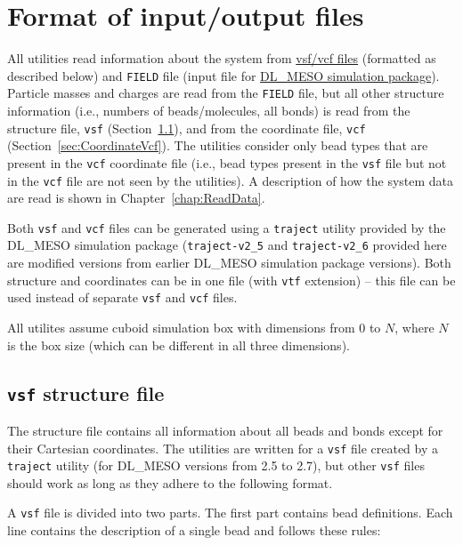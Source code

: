 \chapter{Format of input/output files}\label{chap:input}

All utilities read information about the system from
\href{https://github.com/olenz/vtfplugin/wiki/VTF-format}{vsf/vcf files}
(formatted as described below) and \texttt{FIELD} file (input file for
\href{http://www.scd.stfc.ac.uk//research/app/ccg/software/DL_MESO/40694.aspx}{DL\_MESO
simulation package}).  Particle masses and charges are read from the
\texttt{FIELD} file, but all other structure information (i.e., numbers of
beads/molecules, all bonds) is read from the structure file, \texttt{vsf}
(Section~\ref{sec:StructureVsf}), and from the coordinate file,
\texttt{vcf} (Section~\ref{sec:CoordinateVcf}).  The utilities consider
only bead types that are present in the \texttt{vcf} coordinate file (i.e.,
bead types present in the \texttt{vsf} file but not in the \texttt{vcf}
file are not seen by the utilities). A description of how the system data
are read is shown in Chapter~\ref{chap:ReadData}.

Both \texttt{vsf} and \texttt{vcf} files can be generated using a
\texttt{traject} utility provided by the DL\_MESO simulation package
(\texttt{traject-v2\_5} and \texttt{traject-v2\_6} provided here are
modified versions from earlier DL\_MESO simulation package versions).  Both
structure and coordinates can be in one file (with \texttt{vtf} extension)
-- this file can be used instead of separate \texttt{vsf} and
\texttt{vcf} files.

All utilites assume cuboid simulation box with dimensions from 0 to $N$,
where $N$ is the box size (which can be different in all three dimensions).

\section{\texttt{vsf} structure file} \label{sec:StructureVsf} %

The structure file contains all information about all beads and bonds
except for their Cartesian coordinates. The utilities are written for a
\texttt{vsf} file created by a \texttt{traject} utility (for DL\_MESO
versions from 2.5 to 2.7), but other \texttt{vsf} files should work as long
as they adhere to the following format.

A \texttt{vsf} file is divided into two parts. The first part contains bead
definitions. Each line contains the description of a single bead and
follows these rules:

